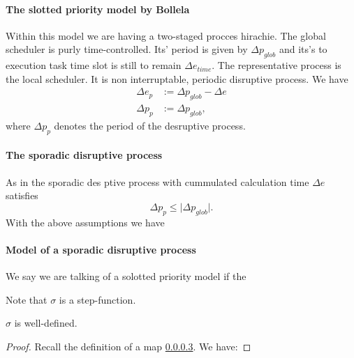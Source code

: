 \paragraph{The slotted priority model by Bollela}

Within this model we are having a two-staged procces hirachie. 
The global scheduler is purly time-controlled.
Its' period is given by $\Delta p_{glob}$ and its's to execution task time slot is still to remain $\Delta e_{time}$.
The representative process is the local scheduler. 
It is non interruptable, periodic disruptive process.
We have
\begin{align}
\Delta e_p &:= \Delta p_{glob} - \Delta e\\
\Delta p_{p} &:= \Delta p_{glob}, 
\end{align}
where $\Delta p_{p}$ denotes the period of the desruptive process.

\paragraph{The sporadic disruptive process}
As in \cite{K} the sporadic des
ptive process with cummulated calculation time $\Delta e$ satisfies
\begin{equation}
\Delta p_{p} \leq \lvert{\Delta p_{glob}} \rvert. 
\end{equation}
With the above assumptions we have

\begin{theorem}
\end{theorem}

\paragraph{Model of a sporadic disruptive process}
We say we are talking of a solotted priority model if the 

\begin{remark}
Note that $\sigma$ is a step-function. 
\end{remark}

\begin{lemma}
 $\sigma$ is well-defined.
\end{lemma}
\begin{proof}
Recall the definition of a map \ref{}. We have:
\end{proof}

